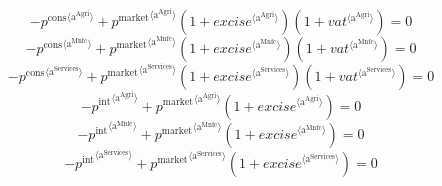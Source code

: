 \begin{equation}
-{p^{\mathrm{cons}}}^{\langle \mathrm{a}^{\mathrm{Agri}}\rangle} + {{p^{\mathrm{market}}}^{\langle \mathrm{a}^{\mathrm{Agri}}\rangle}} \left(1 + {{e\!x\!c\!i\!s\!e}}^{\langle \mathrm{\mathrm{a}^{\mathrm{Agri}}}\rangle}\right) \left(1 + {{v\!a\!t}}^{\langle \mathrm{\mathrm{a}^{\mathrm{Agri}}}\rangle}\right) = 0
\end{equation}
\begin{equation}
-{p^{\mathrm{cons}}}^{\langle \mathrm{a}^{\mathrm{Mnfc}}\rangle} + {{p^{\mathrm{market}}}^{\langle \mathrm{a}^{\mathrm{Mnfc}}\rangle}} \left(1 + {{e\!x\!c\!i\!s\!e}}^{\langle \mathrm{\mathrm{a}^{\mathrm{Mnfc}}}\rangle}\right) \left(1 + {{v\!a\!t}}^{\langle \mathrm{\mathrm{a}^{\mathrm{Mnfc}}}\rangle}\right) = 0
\end{equation}
\begin{equation}
-{p^{\mathrm{cons}}}^{\langle \mathrm{a}^{\mathrm{Services}}\rangle} + {{p^{\mathrm{market}}}^{\langle \mathrm{a}^{\mathrm{Services}}\rangle}} \left(1 + {{e\!x\!c\!i\!s\!e}}^{\langle \mathrm{\mathrm{a}^{\mathrm{Services}}}\rangle}\right) \left(1 + {{v\!a\!t}}^{\langle \mathrm{\mathrm{a}^{\mathrm{Services}}}\rangle}\right) = 0
\end{equation}
\begin{equation}
-{p^{\mathrm{int}}}^{\langle \mathrm{a}^{\mathrm{Agri}}\rangle} + {{p^{\mathrm{market}}}^{\langle \mathrm{a}^{\mathrm{Agri}}\rangle}} \left(1 + {{e\!x\!c\!i\!s\!e}}^{\langle \mathrm{\mathrm{a}^{\mathrm{Agri}}}\rangle}\right) = 0
\end{equation}
\begin{equation}
-{p^{\mathrm{int}}}^{\langle \mathrm{a}^{\mathrm{Mnfc}}\rangle} + {{p^{\mathrm{market}}}^{\langle \mathrm{a}^{\mathrm{Mnfc}}\rangle}} \left(1 + {{e\!x\!c\!i\!s\!e}}^{\langle \mathrm{\mathrm{a}^{\mathrm{Mnfc}}}\rangle}\right) = 0
\end{equation}
\begin{equation}
-{p^{\mathrm{int}}}^{\langle \mathrm{a}^{\mathrm{Services}}\rangle} + {{p^{\mathrm{market}}}^{\langle \mathrm{a}^{\mathrm{Services}}\rangle}} \left(1 + {{e\!x\!c\!i\!s\!e}}^{\langle \mathrm{\mathrm{a}^{\mathrm{Services}}}\rangle}\right) = 0
\end{equation}

